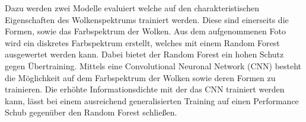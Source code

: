 Dazu werden zwei Modelle evaluiert welche auf den charakteristischen
Eigenschaften des Wolkenspektrums trainiert werden. 
Diese sind einerseits die Formen, sowie das Farbspektrum der Wolken.
Aus dem aufgenommenen Foto wird ein diskretes Farbspektrum erstellt, welches 
mit einem Random Forest ausgewertet werden kann.
Dabei bietet der Random Forest ein hohen Schutz gegen Übertraining.
Mittels eine Convolutional Neuronal Network (CNN) besteht die Möglichkeit auf
dem Farbspektrum der Wolken sowie deren Formen zu trainieren. 
Die erhöhte Informationsdichte mit der das CNN trainiert werden kann, 
lässt bei einem ausreichend generalisierten Training auf einen Performance 
Schub gegenüber den Random Forest schließen.


